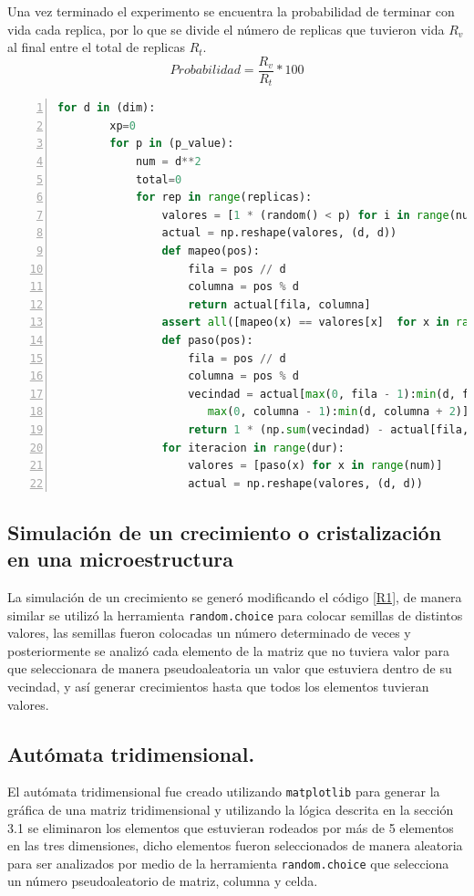 \documentclass{article}
\begin{document}
Una vez terminado el experimento se encuentra la probabilidad de terminar con vida cada replica, por lo que se divide el número de replicas que tuvieron vida $R_v$al final entre el total de replicas $R_t$.
\begin{equation}
    Probabilidad=\frac{R_v}{R_t}*100
\end{equation}
\lstset{basicstyle=\ttfamily, keywordstyle=\bfseries}
\begin{lstlisting}[frame=single,numbers=left,language=Python,caption=Programación de un autómata celular variando el valor de $p$ y $num$\label{R1}]
  for d in (dim):
        xp=0
        for p in (p_value):
            num = d**2
            total=0
            for rep in range(replicas):
                valores = [1 * (random() < p) for i in range(num)]
                actual = np.reshape(valores, (d, d))
                def mapeo(pos):  
                    fila = pos // d
                    columna = pos % d
                    return actual[fila, columna]
                assert all([mapeo(x) == valores[x]  for x in range(num)])
                def paso(pos):
                    fila = pos // d
                    columna = pos % d
                    vecindad = actual[max(0, fila - 1):min(d, fila +2),
                       max(0, columna - 1):min(d, columna + 2)]
                    return 1 * (np.sum(vecindad) - actual[fila, columna] == 3)
                for iteracion in range(dur):
                    valores = [paso(x) for x in range(num)]
                    actual = np.reshape(valores, (d, d))
\end{lstlisting}  
\subsection{Simulación de un crecimiento o cristalización en una microestructura}
La simulación de un crecimiento se generó modificando el código \ref{R1}, de manera similar se utilizó la herramienta \texttt{random.choice} para colocar semillas de distintos valores, las semillas fueron colocadas un número determinado de veces y posteriormente se analizó cada elemento de la matriz que no tuviera valor para que seleccionara de manera pseudoaleatoria un valor que estuviera dentro de su vecindad, y así generar crecimientos hasta que todos los elementos tuvieran valores.
\subsection{Autómata tridimensional.}
El autómata tridimensional fue creado utilizando \texttt{matplotlib} para generar la gráfica de una matriz tridimensional y utilizando la lógica descrita en la sección 3.1 se eliminaron los elementos que estuvieran rodeados por más de 5 elementos en las tres dimensiones, dicho elementos fueron seleccionados de manera aleatoria para ser analizados por medio de la herramienta \texttt{random.choice} que selecciona un número pseudoaleatorio de matriz, columna y celda.
\end{document}
